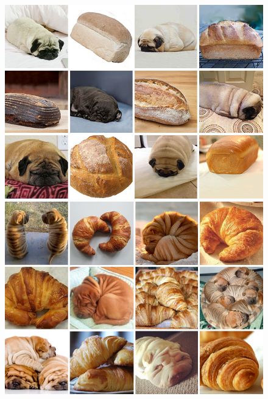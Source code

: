 \documentclass[a4paper, oneside]{discothesis}
\begin{document}
\begin{figure}[th]
	\vspace{1em}

	\begin{minipage}[t]{0.24\textwidth}\centering\includegraphics[width=\textwidth]{figures/dog-vs-loaf.jpeg}\end{minipage}
	\hfill
	\begin{minipage}[t]{0.24\textwidth}\centering\includegraphics[width=\textwidth]{figures/dog-vs-crossaint.jpeg}\end{minipage}
	\hfill

\end{figure}
\end{document}
